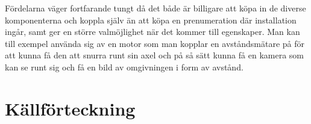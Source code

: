 \documentclass{article}
\begin{document}
\noindent
Fördelarna väger fortfarande tungt då det både är billigare att köpa in de diverse komponenterna och koppla själv än att köpa en prenumeration där installation ingår, samt ger en större valmöjlighet när det kommer till egenskaper. 
Man kan till exempel använda sig av en motor som man kopplar en avståndsmätare på för att kunna få den att snurra runt sin axel och på så sätt kunna få en kamera som kan se runt sig och få en bild av omgivningen i form av avstånd.\\

\newpage
\section*{Källförteckning}
\printbibliography[heading=none]
\end{document}
